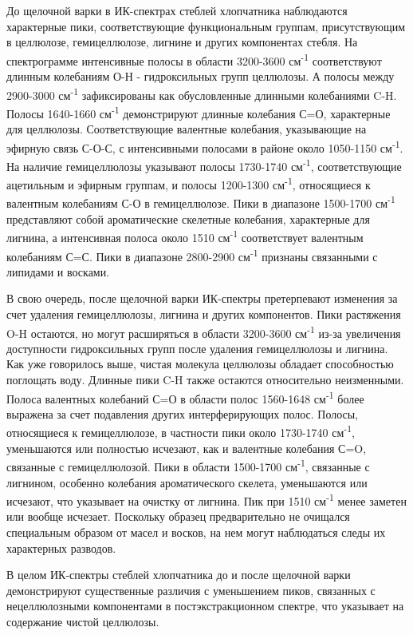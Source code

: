 \begin{multicols}{2}
До щелочной варки в ИК-спектрах стеблей хлопчатника наблюдаются
характерные пики, соответствующие функциональным группам, присутствующим
в целлюлозе, гемицеллюлозе, лигнине и других компонентах стебля. На
спектрограмме интенсивные полосы в области 3200-3600
см\textsuperscript{-1} соответствуют длинным колебаниям О-Н -
гидроксильных групп целлюлозы. А полосы между 2900-3000
см\textsuperscript{-1} зафиксированы как обусловленные длинными
колебаниями C-H. Полосы 1640-1660 см\textsuperscript{-1} демонстрируют
длинные колебания С=О, характерные для целлюлозы. Соответствующие
валентные колебания, указывающие на эфирную связь С-О-С, с интенсивными
полосами в районе около 1050-1150 см\textsuperscript{-1}. На наличие
гемицеллюлозы указывают полосы 1730-1740 см\textsuperscript{-1},
соответствующие ацетильным и эфирным группам, и полосы 1200-1300
см\textsuperscript{-1}, относящиеся к валентным колебаниям С-О в
гемицеллюлозе. Пики в диапазоне 1500-1700 см\textsuperscript{-1}
представляют собой ароматические скелетные колебания, характерные для
лигнина, а интенсивная полоса около 1510 см\textsuperscript{-1}
соответствует валентным колебаниям С=С. Пики в диапазоне 2800-2900
см\textsuperscript{-1} признаны связанными с липидами и восками.

В свою очередь, после щелочной варки ИК-спектры претерпевают изменения
за счет удаления гемицеллюлозы, лигнина и других компонентов. Пики
растяжения O-H остаются, но могут расширяться в области 3200-3600
см\textsuperscript{-1} из-за увеличения доступности гидроксильных групп
после удаления гемицеллюлозы и лигнина. Как уже говорилось выше, чистая
молекула целлюлозы обладает способностью поглощать воду. Длинные пики
C-H также остаются относительно неизменными. Полоса валентных колебаний
С=О в области полос 1560-1648 см\textsuperscript{-1} более выражена за
счет подавления других интерферирующих полос. Полосы, относящиеся к
гемицеллюлозе, в частности пики около 1730-1740 см\textsuperscript{-1},
уменьшаются или полностью исчезают, как и валентные колебания С=O,
связанные с гемицеллюлозой. Пики в области 1500-1700
см\textsuperscript{-1}, связанные с лигнином, особенно колебания
ароматического скелета, уменьшаются или исчезают, что указывает на
очистку от лигнина. Пик при 1510 см\textsuperscript{-1} менее заметен
или вообще исчезает. Поскольку образец предварительно не очищался
специальным образом от масел и восков, на нем могут наблюдаться следы их
характерных разводов.

В целом ИК-спектры стеблей хлопчатника до и после щелочной варки
демонстрируют существенные различия с уменьшением пиков, связанных с
нецеллюлозными компонентами в постэкстракционном спектре, что указывает
на содержание чистой целлюлозы.


\end{multicols}
